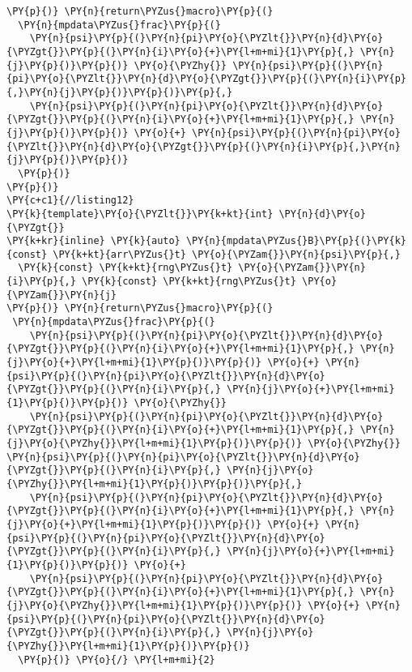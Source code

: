 \begin{Verbatim}[commandchars=\\\{\}]
\PY{p}{)} \PY{n}{return\PYZus{}macro}\PY{p}{(}
  \PY{n}{mpdata\PYZus{}frac}\PY{p}{(}
    \PY{n}{psi}\PY{p}{(}\PY{n}{pi}\PY{o}{\PYZlt{}}\PY{n}{d}\PY{o}{\PYZgt{}}\PY{p}{(}\PY{n}{i}\PY{o}{+}\PY{l+m+mi}{1}\PY{p}{,} \PY{n}{j}\PY{p}{)}\PY{p}{)} \PY{o}{\PYZhy{}} \PY{n}{psi}\PY{p}{(}\PY{n}{pi}\PY{o}{\PYZlt{}}\PY{n}{d}\PY{o}{\PYZgt{}}\PY{p}{(}\PY{n}{i}\PY{p}{,}\PY{n}{j}\PY{p}{)}\PY{p}{)}\PY{p}{,}
    \PY{n}{psi}\PY{p}{(}\PY{n}{pi}\PY{o}{\PYZlt{}}\PY{n}{d}\PY{o}{\PYZgt{}}\PY{p}{(}\PY{n}{i}\PY{o}{+}\PY{l+m+mi}{1}\PY{p}{,} \PY{n}{j}\PY{p}{)}\PY{p}{)} \PY{o}{+} \PY{n}{psi}\PY{p}{(}\PY{n}{pi}\PY{o}{\PYZlt{}}\PY{n}{d}\PY{o}{\PYZgt{}}\PY{p}{(}\PY{n}{i}\PY{p}{,}\PY{n}{j}\PY{p}{)}\PY{p}{)}
  \PY{p}{)} 
\PY{p}{)} 
\PY{c+c1}{//listing12}
\PY{k}{template}\PY{o}{\PYZlt{}}\PY{k+kt}{int} \PY{n}{d}\PY{o}{\PYZgt{}}
\PY{k+kr}{inline} \PY{k}{auto} \PY{n}{mpdata\PYZus{}B}\PY{p}{(}\PY{k}{const} \PY{k+kt}{arr\PYZus{}t} \PY{o}{\PYZam{}}\PY{n}{psi}\PY{p}{,} 
  \PY{k}{const} \PY{k+kt}{rng\PYZus{}t} \PY{o}{\PYZam{}}\PY{n}{i}\PY{p}{,} \PY{k}{const} \PY{k+kt}{rng\PYZus{}t} \PY{o}{\PYZam{}}\PY{n}{j}
\PY{p}{)} \PY{n}{return\PYZus{}macro}\PY{p}{(}
 \PY{n}{mpdata\PYZus{}frac}\PY{p}{(}
    \PY{n}{psi}\PY{p}{(}\PY{n}{pi}\PY{o}{\PYZlt{}}\PY{n}{d}\PY{o}{\PYZgt{}}\PY{p}{(}\PY{n}{i}\PY{o}{+}\PY{l+m+mi}{1}\PY{p}{,} \PY{n}{j}\PY{o}{+}\PY{l+m+mi}{1}\PY{p}{)}\PY{p}{)} \PY{o}{+} \PY{n}{psi}\PY{p}{(}\PY{n}{pi}\PY{o}{\PYZlt{}}\PY{n}{d}\PY{o}{\PYZgt{}}\PY{p}{(}\PY{n}{i}\PY{p}{,} \PY{n}{j}\PY{o}{+}\PY{l+m+mi}{1}\PY{p}{)}\PY{p}{)} \PY{o}{\PYZhy{}}
    \PY{n}{psi}\PY{p}{(}\PY{n}{pi}\PY{o}{\PYZlt{}}\PY{n}{d}\PY{o}{\PYZgt{}}\PY{p}{(}\PY{n}{i}\PY{o}{+}\PY{l+m+mi}{1}\PY{p}{,} \PY{n}{j}\PY{o}{\PYZhy{}}\PY{l+m+mi}{1}\PY{p}{)}\PY{p}{)} \PY{o}{\PYZhy{}} \PY{n}{psi}\PY{p}{(}\PY{n}{pi}\PY{o}{\PYZlt{}}\PY{n}{d}\PY{o}{\PYZgt{}}\PY{p}{(}\PY{n}{i}\PY{p}{,} \PY{n}{j}\PY{o}{\PYZhy{}}\PY{l+m+mi}{1}\PY{p}{)}\PY{p}{)}\PY{p}{,}
    \PY{n}{psi}\PY{p}{(}\PY{n}{pi}\PY{o}{\PYZlt{}}\PY{n}{d}\PY{o}{\PYZgt{}}\PY{p}{(}\PY{n}{i}\PY{o}{+}\PY{l+m+mi}{1}\PY{p}{,} \PY{n}{j}\PY{o}{+}\PY{l+m+mi}{1}\PY{p}{)}\PY{p}{)} \PY{o}{+} \PY{n}{psi}\PY{p}{(}\PY{n}{pi}\PY{o}{\PYZlt{}}\PY{n}{d}\PY{o}{\PYZgt{}}\PY{p}{(}\PY{n}{i}\PY{p}{,} \PY{n}{j}\PY{o}{+}\PY{l+m+mi}{1}\PY{p}{)}\PY{p}{)} \PY{o}{+}
    \PY{n}{psi}\PY{p}{(}\PY{n}{pi}\PY{o}{\PYZlt{}}\PY{n}{d}\PY{o}{\PYZgt{}}\PY{p}{(}\PY{n}{i}\PY{o}{+}\PY{l+m+mi}{1}\PY{p}{,} \PY{n}{j}\PY{o}{\PYZhy{}}\PY{l+m+mi}{1}\PY{p}{)}\PY{p}{)} \PY{o}{+} \PY{n}{psi}\PY{p}{(}\PY{n}{pi}\PY{o}{\PYZlt{}}\PY{n}{d}\PY{o}{\PYZgt{}}\PY{p}{(}\PY{n}{i}\PY{p}{,} \PY{n}{j}\PY{o}{\PYZhy{}}\PY{l+m+mi}{1}\PY{p}{)}\PY{p}{)}
  \PY{p}{)} \PY{o}{/} \PY{l+m+mi}{2}

\end{Verbatim}
